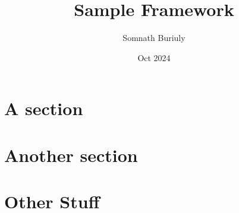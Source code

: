 \documentclass[a4paper]{article}
\title{Sample Framework}
\author{Somnath Buriuly}
\date{Oct 2024}
\begin{document}
\subbuildfalse 




\maketitle

\section{A section}
 
\section{Another section}
 
\section{Other Stuff}
 
 
%  
%  
%  
 

\printbibliography[title=List of all References]
\end{document}
